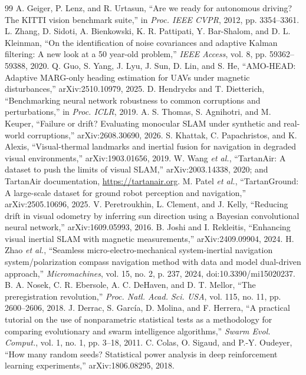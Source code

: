 \begin{thebibliography}{99}
 A. Geiger, P. Lenz, and R. Urtasun, ``Are we ready for autonomous driving? The KITTI vision benchmark suite,'' in \emph{Proc. IEEE CVPR}, 2012, pp. 3354--3361.
 L. Zhang, D. Sidoti, A. Bienkowski, K. R. Pattipati, Y. Bar-Shalom, and D. L. Kleinman, ``On the identification of noise covariances and adaptive Kalman filtering: A new look at a 50 year-old problem,'' \emph{IEEE Access}, vol. 8, pp. 59362--59388, 2020.
 Q. Guo, S. Yang, J. Lyu, J. Sun, D. Lin, and S. He, ``AMO-HEAD: Adaptive MARG-only heading estimation for UAVs under magnetic disturbances,'' arXiv:2510.10979, 2025.
 D. Hendrycks and T. Dietterich, ``Benchmarking neural network robustness to common corruptions and perturbations,'' in \emph{Proc. ICLR}, 2019.
 A. S. Thomas, S. Agnihotri, and M. Keuper, ``Failure or drift? Evaluating monocular SLAM under synthetic and real-world corruptions,'' arXiv:2608.30690, 2026.
 S. Khattak, C. Papachristos, and K. Alexis, ``Visual-thermal landmarks and inertial fusion for navigation in degraded visual environments,'' arXiv:1903.01656, 2019.
 W. Wang \emph{et al.}, ``TartanAir: A dataset to push the limits of visual SLAM,'' arXiv:2003.14338, 2020; and TartanAir documentation, \url{https://tartanair.org}.
 M. Patel \emph{et al.}, ``TartanGround: A large-scale dataset for ground robot perception and navigation,'' arXiv:2505.10696, 2025.
 V. Peretroukhin, L. Clement, and J. Kelly, ``Reducing drift in visual odometry by inferring sun direction using a Bayesian convolutional neural network,'' arXiv:1609.05993, 2016.
 B. Joshi and I. Rekleitis, ``Enhancing visual inertial SLAM with magnetic measurements,'' arXiv:2409.09904, 2024.
 H. Zhao \emph{et al.}, ``Seamless micro-electro-mechanical system-inertial navigation system/polarization compass navigation method with data and model dual-driven approach,'' \emph{Micromachines}, vol. 15, no. 2, p. 237, 2024, doi:10.3390/mi15020237.
 B. A. Nosek, C. R. Ebersole, A. C. DeHaven, and D. T. Mellor, ``The preregistration revolution,'' \emph{Proc. Natl. Acad. Sci. USA}, vol. 115, no. 11, pp. 2600--2606, 2018.
 J. Derrac, S. Garc\'ia, D. Molina, and F. Herrera, ``A practical tutorial on the use of nonparametric statistical tests as a methodology for comparing evolutionary and swarm intelligence algorithms,'' \emph{Swarm Evol. Comput.}, vol. 1, no. 1, pp. 3--18, 2011.
 C. Colas, O. Sigaud, and P.-Y. Oudeyer, ``How many random seeds? Statistical power analysis in deep reinforcement learning experiments,'' arXiv:1806.08295, 2018.

\end{thebibliography}
